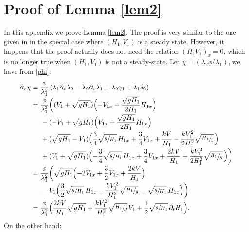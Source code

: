 \documentclass[JEP,XML,SOM,Unicode]{cedram}
\theoremstyle{definition}
\begin{document}
\section{Proof of Lemma \ref{lem2}}
\label{sec:prooflem2}
In this appendix we prove Lemma \ref{lem2}. The proof is very similar to the {one} given in \cite{HS} in the special case where $(H_{1},V_{1})$ is a steady state. However, it happens that the proof actually does not need the relation $(H_{1}V_{1})_{x}=0$, which is no longer true when $(H_{1},V_{1})$ is not a steady-state. Let $\chi=(\lambda_{2}\phi/\lambda_{1})$, we have from \eqref{phi}:
\begin{equation}
\begin{split}
\partial_{x}\chi&=\frac{\phi}{\lambda_{1}^{2}}\left(\lambda_{1}\partial_{x}\lambda_{2}-\lambda_{2}\partial_{x}\lambda_{1}+\lambda_{2}\gamma_{1}+\lambda_{1}\delta_{2}\right)\\[-3pt]
&=\frac{\phi}{\lambda_{1}^{2}}\biggl((V_{1}+\sqrt{gH_{1}}) \Bigl(-V_{1x}+\frac{\sqrt{gH_{1}}}{2H_{1}}H_{1x}\Bigr)\\[-3pt]
&\hspace*{.5cm}-(-V_{1}+\sqrt{gH_{1}})\Bigl(V_{1x}+\frac{\sqrt{gH_{1}}}{2H_{1}}H_{1x}\Bigr)\\[-3pt]
&\hspace*{.5cm}+(\sqrt{gH_{1}}-V_{1}) \Bigl(\frac{3}{4}\sqrt{\sfrac{g}{H_{1}}}\,H_{1x}+\frac{3}{4}V_{1x}+\frac{kV}{H_{1}}-\frac{kV_{1}^{2}}{2H_{1}^{2}}\sqrt{\sfrac{H_{1}}{g}}\, \Bigr)\\[-3pt]
&\hspace*{.5cm}+(V_{1}+\sqrt{gH_{1}}) \Bigl(-\frac{3}{4}\sqrt{\sfrac{g}{H_{1}}}\,H_{1x}+\frac{3}{4}V_{1x}+\frac{2kV}{H_{1}}+\frac{kV_{1}^{2}}{2H_{1}^{2}}\sqrt{\sfrac{H_{1}}{g}}\, \Bigr)\biggr)\\[-3pt]
&=\frac{\phi}{\lambda_{1}^{2}}\biggl(\sqrt{gH_{1}} \Bigl(-2V_{1x}+\frac{3}{2}V_{1x}+\frac{2kV}{H_{1}} \Bigr)\\[-3pt]
&\hspace*{.5cm}-V_{1} \Bigl(\frac{3}{2}\sqrt{\sfrac{g}{H_{1}}}\,H_{1x}-\frac{kV_{1}^{2}}{H_{1}^{2}}\sqrt{\sfrac{H_{1}}{g}}\,-\sqrt{\sfrac{g}{H_{1}}}\,H_{1x} \Bigr)\biggr)\\[-3pt]
&=\frac{\phi}{\lambda_{1}^{2}} \Bigl(\frac{2kV}{H_{1}}\sqrt{gH_{1}}+\frac{kV_{1}^{2}}{H_{1}^{2}}\sqrt{\sfrac{H_{1}}{g}}\,V_{1}+\frac{1}{2}\sqrt{\sfrac{g}{H_{1}}}\,\partial_{t}H_{1} \Bigr).
\end{split}
\label{Le1}
\end{equation}
{On} the other hand:
\end{document}

